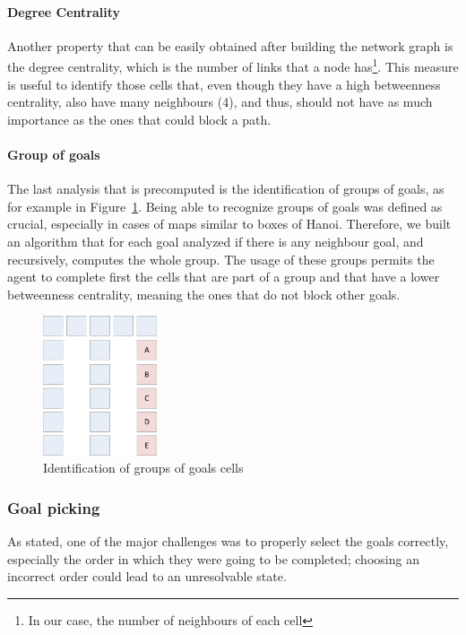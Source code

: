 \paragraph{Degree Centrality}

Another property that can be easily obtained after building the network graph is the degree centrality, which
is the number of links that a node has\footnote{In our case, the number of neighbours of each cell}. This
measure is useful to identify those cells that, even though they have a high betweenness centrality, also have
many neighbours (4), and thus, should not have as much importance as the ones that could block a path.

\paragraph{Group of goals}

The last analysis that is precomputed is the identification of groups of goals, as for example in
Figure~\ref{fig:goalshanoi}. Being able to recognize groups of goals was defined as crucial, especially in
cases of maps similar to boxes of Hanoi. Therefore, we built an algorithm that for each goal analyzed if there
is any neighbour goal, and recursively, computes the whole group. The usage of these groups permits the agent
to complete first the cells that are part of a group and that have a lower betweenness centrality, meaning the
ones that do not block other goals.

\begin{figure}[htb]
\begin{center}
 \includegraphics[width=0.3\textwidth]{figures/goalshanoi.png}
 \caption{Identification of groups of goals cells}
 \label{fig:goalshanoi}
\end{center}
\end{figure}


\subsubsection{Goal picking}
As stated, one of the major challenges was to properly select the goals correctly, especially the order in
which they were going to be completed; choosing an incorrect order could lead to an unresolvable state.

